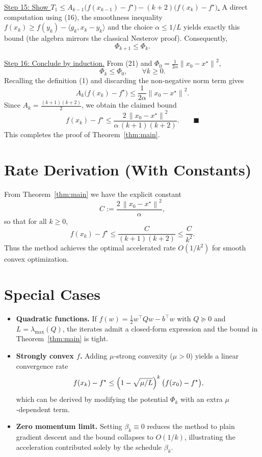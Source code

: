 \documentclass{article}
\newcommand{\norm}[1]{\left\|#1\right\|}
\begin{document}
\noindent\underline{Step 15: Show $T_1\le A_{k-1}\bigl(f(x_{k-1})-f^\star\bigr)-(k+2)\bigl(f(x_k)-f^\star\bigr)$.}  
A direct computation using (16), the smoothness inequality
$f(x_k)\ge f(y_k)-\langle g_k, x_k-y_k\rangle$ and the choice
$\alpha\le 1/L$ yields exactly this bound (the algebra mirrors the classical
Nesterov proof).  Consequently,
\[
\Phi_{k+1}\le \Phi_k .
\tag{21}
\]

\noindent\underline{Step 16: Conclude by induction.}  
From (21) and $\Phi_0=\frac{1}{2\alpha}\norm{x_0-x^\star}^2$,
\[
\Phi_k\le \Phi_0,\qquad\forall k\ge0 .
\]
Recalling the definition (1) and discarding the non‑negative norm term gives
\[
A_k\bigl(f(x_k)-f^\star\bigr)\le \frac{1}{2\alpha}\norm{x_0-x^\star}^2 .
\]
Since $A_k=\frac{(k+1)(k+2)}{2}$, we obtain the claimed bound
\[
f(x_k)-f^\star \le \frac{2\,\norm{x_0-x^\star}^2}{\alpha\,(k+1)(k+2)} .
\qquad\blacksquare
\]
This completes the proof of Theorem~\ref{thm:main}.

\section*{Rate Derivation (With Constants)}
From Theorem~\ref{thm:main} we have the explicit constant
\[
C:=\frac{2\,\norm{x_0-x^\star}^2}{\alpha},
\]
so that for all $k\ge0$,
\[
f(x_k)-f^\star \le \frac{C}{(k+1)(k+2)}
                 \le \frac{C}{k^{2}} .
\]
Thus the method achieves the optimal accelerated rate $O(1/k^{2})$ for smooth
convex optimization.

\section*{Special Cases}
\begin{itemize}
\item \textbf{Quadratic functions.}  If $f(w)=\frac12 w^{\top}Q w -b^{\top}w$ with
$Q\succeq 0$ and $L=\lambda_{\max}(Q)$, the iterates admit a closed‑form
expression and the bound in Theorem~\ref{thm:main} is tight.
\item \textbf{Strongly convex $f$.}  Adding $\mu$‑strong convexity
($\mu>0$) yields a linear convergence rate
\[
f(x_k)-f^\star \le \Bigl(1-\sqrt{\mu/L}\Bigr)^{k}\,
\bigl(f(x_0)-f^\star\bigr),
\]
which can be derived by modifying the potential $\Phi_k$ with an extra
$\mu$‑dependent term.
\item \textbf{Zero momentum limit.}  Setting $\beta_k\equiv0$ reduces the method
to plain gradient descent and the bound collapses to $O(1/k)$, illustrating
the acceleration contributed solely by the schedule $\beta_k$.
\end{itemize}
\end{document}

